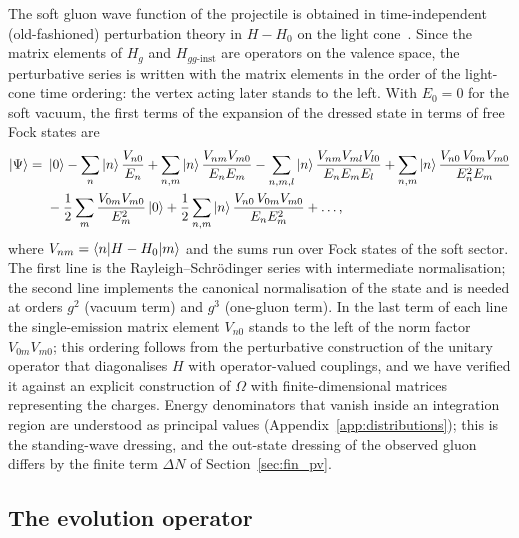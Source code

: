 The soft gluon wave function of the projectile is obtained in time-independent (old-fashioned) perturbation theory in $H-H_0$ on the light cone~\cite{Lepage:1980fj,Brodsky:1997de}. Since the matrix elements of $H_g$ and $H_{gg\text{-inst}}$ are operators on the valence space, the perturbative series is written with the matrix elements in the order of the light-cone time ordering: the vertex acting later stands to the left. With $E_0=0$ for the soft vacuum, the first terms of the expansion of the dressed state in terms of free Fock states are
\begin{align}\label{eq:lcpt}
\ket{\Psi}=\ &\ket0-\sum_n\ket n\frac{V_{n0}}{E_n}+\sum_{n,m}\ket n\frac{V_{nm}V_{m0}}{E_nE_m}
-\sum_{n,m,l}\ket n\frac{V_{nm}V_{ml}V_{l0}}{E_nE_mE_l}
+\sum_{n,m}\ket n\frac{V_{n0}\,V_{0m}V_{m0}}{E_n^2E_m}
\notag\\
&-\frac12\sum_m\frac{V_{0m}V_{m0}}{E_m^2}\ket0
+\frac12\sum_{n,m}\ket n\frac{V_{n0}\,V_{0m}V_{m0}}{E_nE_m^2}+\dots,
\end{align}
where $V_{nm}=\braket{n|H-H_0|m}$ and the sums run over Fock states of the soft sector. The first line is the Rayleigh--Schr\"odinger series with intermediate normalisation; the second line implements the canonical normalisation of the state and is needed at orders $g^2$ (vacuum term) and $g^3$ (one-gluon term). In the last term of each line the single-emission matrix element $V_{n0}$ stands to the left of the norm factor $V_{0m}V_{m0}$; this ordering follows from the perturbative construction of the unitary operator that diagonalises $H$ with operator-valued couplings, and we have verified it against an explicit construction of $\Omega$ with finite-dimensional matrices representing the charges. Energy denominators that vanish inside an integration region are understood as principal values (Appendix~\ref{app:distributions}); this is the standing-wave dressing, and the out-state dressing of the observed gluon differs by the finite term $\Delta N$ of Section~\ref{sec:fin_pv}.

\subsection{The evolution operator}\label{sec:omega}


